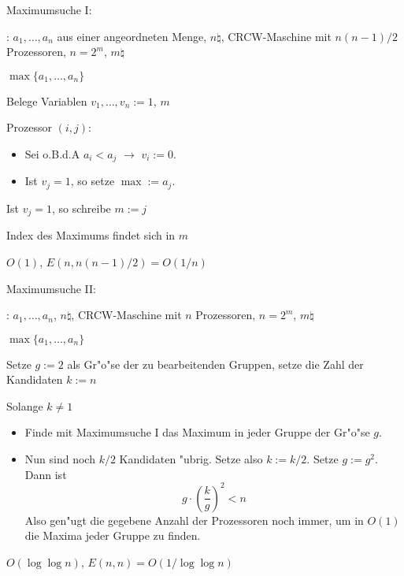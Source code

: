 \algorithm Maximumsuche I:{
  \given: $a_1,\ldots,a_n$ aus einer angeordneten Menge, $n\natural$, 
    CRCW-Maschine mit $n(n-1)/2$ Prozessoren, $n=2^m$, $m\natural$
  
  \aim $\max\{a_1,\ldots,a_n\}$
  
  \begin{proc}
    \item Belege Variablen $v_1,\ldots,v_n:=1$, $m$
    \item Prozessor $(i,j)$: 
      \begin{itemize}
        \item Sei o.B.d.A $a_i<a_j$ $\rightarrow$ $v_i:=0$. 
        \item Ist $v_j=1$, so setze $\max:=a_j$.
      \end{itemize}
    \item Ist $v_j=1$, so schreibe $m:=j$
    \item Index des Maximums findet sich in $m$
  \end{proc}
  
  \cpx $O(1)$, $E(n,n(n-1)/2)=O(1/n)$
}
\algorithm Maximumsuche II:{
  \given: $a_1,\ldots,a_n$, $n\natural$, CRCW-Maschine mit $n$ Prozessoren,
    $n=2^m$, $m\natural$
  
  \aim $\max\{a_1,\ldots,a_n\}$
  
  \begin{proc}
    \item Setze $g:=2$ als Gr"o"se der zu bearbeitenden Gruppen, 
      setze die Zahl der Kandidaten $k:=n$
    \item Solange $k\ne 1$
      \begin{itemize}
        \item Finde mit Maximumsuche I das Maximum in jeder Gruppe der 
          Gr"o"se $g$.
        \item Nun sind noch $k/2$ Kandidaten "ubrig. Setze also $k:=k/2$.
          Setze $g:=g^2$.
          Dann ist 
          \[
            g\cdot\left(\frac k g\right)^2 <n
          \]
          Also gen"ugt die gegebene Anzahl der Prozessoren noch immer, um
          in $O(1)$ die Maxima jeder Gruppe zu finden.
      \end{itemize}
  \end{proc}
  
  \cpx $O(\log\log n)$, $E(n,n)=O(1/\log\log n)$
}
